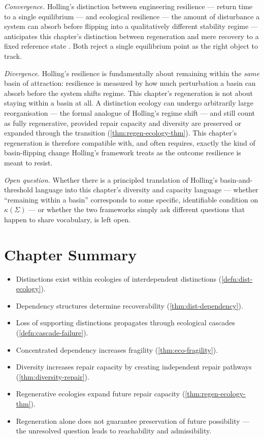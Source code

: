 \documentclass[12pt,twoside,openright]{book}
\newenvironment{chapsummary}{%
  \begin{tcolorbox}[colback=DistBlue!5,colframe=DistBlue,
    title={\faBookOpen\enspace Summary},
    fonttitle=\sffamily\bfseries\color{white},
    attach boxed title to top left={yshift=-2mm,xshift=4mm},
    boxed title style={colback=DistBlue,rounded corners}]
  \begin{itemize}[nosep,leftmargin=*]}{%
  \end{itemize}\end{tcolorbox}}
\begin{document}
\emph{Convergence.} Holling's distinction between engineering
resilience --- return time to a single equilibrium --- and
ecological resilience --- the amount of disturbance a system
can absorb before flipping into a qualitatively different
stability regime --- anticipates this chapter's distinction
between regeneration and mere recovery to a fixed reference
state \parencite{holling1973}. Both reject a single equilibrium
point as the right object to track.

\emph{Divergence.} Holling's resilience is fundamentally about
remaining within the \emph{same} basin of attraction: resilience
is measured by how much perturbation a basin can absorb before
the system shifts regime. This chapter's regeneration is not
about staying within a basin at all. A distinction ecology can
undergo arbitrarily large reorganisation --- the formal analogue
of Holling's regime shift --- and still count as fully
regenerative, provided repair capacity and diversity are
preserved or expanded through the transition
(\cref{thm:regen-ecology-thm}). This chapter's regeneration is
therefore compatible with, and often requires, exactly the kind
of basin-flipping change Holling's framework treats as the
outcome resilience is meant to resist.

\emph{Open question.} Whether there is a principled translation
of Holling's basin-and-threshold language into this chapter's
diversity and capacity language --- whether ``remaining within a
basin'' corresponds to some specific, identifiable condition on
$\kappa(\Sigma)$ --- or whether the two frameworks simply ask
different questions that happen to share vocabulary, is left
open.

\section*{Chapter Summary}
\begin{chapsummary}
  \item Distinctions exist within ecologies of
        interdependent distinctions
        (\cref{defn:dist-ecology}).
  \item Dependency structures determine recoverability
        (\cref{thm:dist-dependency}).
  \item Loss of supporting distinctions propagates through
        ecological cascades (\cref{defn:cascade-failure}).
  \item Concentrated dependency increases fragility
        (\cref{thm:eco-fragility}).
  \item Diversity increases repair capacity by creating
        independent repair pathways
        (\cref{thm:diversity-repair}).
  \item Regenerative ecologies expand future repair
        capacity (\cref{thm:regen-ecology-thm}).
  \item Regeneration alone does not guarantee preservation
        of future possibility --- the unresolved question
        leads to reachability and admissibility.
\end{chapsummary}
\end{document}
